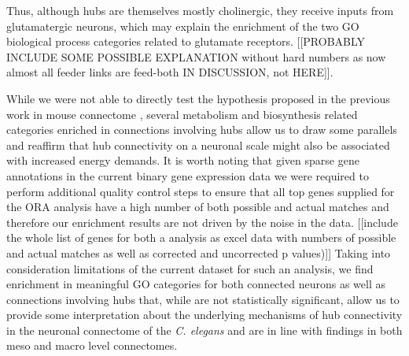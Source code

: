 \documentclass[10pt,letterpaper]{article}
\begin{document}


Thus, although hubs are themselves mostly cholinergic, they receive inputs from glutamatergic neurons, which may explain the enrichment of the two GO biological process categories related to glutamate receptors.
[[PROBABLY INCLUDE SOME POSSIBLE EXPLANATION without hard numbers as now almost all feeder links are feed-both IN DISCUSSION, not HERE]]. 

While we were not able to directly test the hypothesis proposed in the previous work in mouse connectome \cite{Fulcher2016}, several metabolism and biosynthesis related categories enriched in connections involving hubs allow us to draw some parallels and reaffirm that hub connectivity on a neuronal scale might also be associated with increased energy demands.
It is worth noting that given sparse gene annotations in the current binary gene expression data we were required to perform additional quality control steps to ensure that all top genes supplied for the ORA analysis have a high number of both possible and actual matches and therefore our enrichment results are not driven by the noise in the data. [[include the whole list of genes for both a analysis as excel data with numbers of possible and actual matches as well as corrected and uncorrected p values)]]
Taking into consideration limitations of the current dataset for such an analysis, we find enrichment in meaningful GO categories for both connected neurons as well as connections involving hubs that, while are not statistically significant, allow us to provide some interpretation about the underlying mechanisms of hub connectivity in the neuronal connectome of the \textit{C. elegans} and are in line with findings in both meso and macro level connectomes. 

\end{document}

